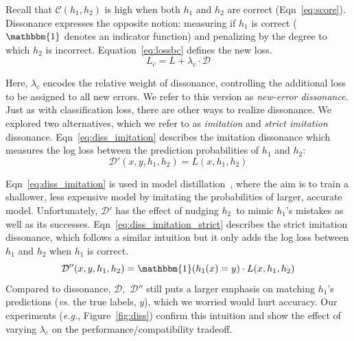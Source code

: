 \documentclass[letterpaper]{article} %
\newcommand{\eg}{\mbox{\it e.g.}}
\newcommand{\?}{\mbox{?}}
\newcommand{\hone}{\mbox{$h_1$}}
\newcommand{\htwo}{\mbox{$h_2$}}
\newcommand{\compatscore}{\mathcal{C}}
\newcommand{\loss}{L}
\newcommand{\lossbc}{\loss_c}
\newcommand{\lambdabc}{\lambda_c}
\newcommand{\dissonance}{\mathcal{D}}
\begin{document}
\noindent Recall that  $\compatscore(\hone, \htwo)$ is high when both $\hone$ and $\htwo$ are correct (Eqn~\ref{eq:score}).  Dissonance  expresses the opposite notion: measuring if $\hone$ is correct ($\mathbbm{1}$ denotes an indicator function)
and penalizing by the degree to which $\htwo$ is incorrect.
Equation~\ref{eq:lossbc} defines the new loss.
\begin{equation}
    \label{eq:lossbc}
    \lossbc = \loss + \lambdabc \cdot \dissonance
\end{equation}

\noindent Here, $\lambdabc$ encodes the relative weight of dissonance, controlling the additional loss to be assigned to all new errors.
We refer to this version as {\em new-error dissonance}.
Just as with classification loss, there are other ways to realize dissonance. We explored two alternatives, which we refer to as {\em imitation} and {\em strict imitation} dissonance.
Eqn~\ref{eq:diss_imitation} describes the imitation dissonance which measures the log loss between the prediction probabilities of $\hone$ and $\htwo$:
\begin{equation}
    \label{eq:diss_imitation}
    \dissonance'(x, y, \hone, \htwo) = \loss(x, \hone, \htwo)
\end{equation}

\noindent Eqn~\ref{eq:diss_imitation} is used in model distillation~\cite{ba2014deep,hinton2015distilling}, where the aim is to train a shallower, less expensive model by imitating the probabilities of larger, accurate model. Unfortunately, $\dissonance'$ has the effect of nudging \htwo\ to mimic \hone's mistakes as well as its successes.  
Eqn~\ref{eq:diss_imitation_strict} describes the strict imitation dissonance, which follows a similar intuition but it only adds the log loss between $\hone$ and $\htwo$ when $\hone$ is correct.
\begin{equation}
    \label{eq:diss_imitation_strict}
    \dissonance''(x, y, \hone, \htwo) = \mathbbm{1}(\hone(x) = y) \cdot \loss(x, \hone, \htwo)
\end{equation}
\noindent Compared to dissonance, $\dissonance,$  $\dissonance''$ still puts a larger emphasis on matching \hone's predictions ({\em vs.} the true labels, $y$), which we worried would hurt accuracy. Our experiments (\eg, Figure~\ref{fig:diss}) confirm this intuition and show the effect of varying
$\lambdabc$ on the performance/compatibility tradeoff. %
\end{document}

